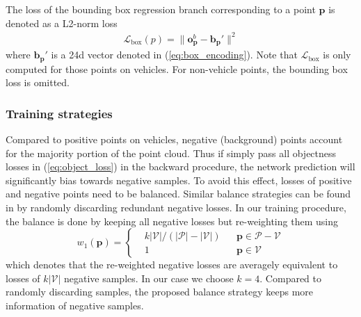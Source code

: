 \documentclass[conference]{IEEEtran}
\begin{document}
The loss of the bounding box regression branch corresponding to a point $\mathbf{p}$ is denoted as a L2-norm loss
\begin{equation}
\begin{aligned}
    \mathcal{L}_\textrm{box}(p) = \| \mathbf{o}^b_{\mathbf{p}} - \mathbf{b}_\mathbf{p}' \|^2
\end{aligned}
\label{eq:box_loss}
\end{equation}
where $\mathbf{b}_\mathbf{p}'$ is a 24d vector denoted in (\ref{eq:box_encoding}). Note that $\mathcal{L}_\textrm{box}$ is only computed for those points on vehicles. For non-vehicle points, the bounding box loss is omitted. 

\subsubsection{Training strategies}
Compared to positive points on vehicles, negative (background) points account for the majority portion of the point cloud. Thus if simply pass all objectness losses in (\ref{eq:object_loss}) in the backward procedure, the network prediction will significantly bias towards negative samples. To avoid this effect, losses of positive and negative points need to be balanced. Similar balance strategies can be found in \citet{Huang2015} by randomly discarding redundant negative losses. In our training procedure, the balance is done by keeping all negative losses but re-weighting them using
\begin{equation}
w_1(\mathbf{p}) = \left \{
\begin{aligned}
    & k |\mathcal{V}| / (|\mathcal{P}| - |\mathcal{V}|) & & {\mathbf{p} \in \mathcal{P} - \mathcal{V}} \\
    & 1 & & {\mathbf{p} \in \mathcal{V}}
\end{aligned}
\right.
\end{equation}
which denotes that the re-weighted negative losses are averagely equivalent to losses of $k |\mathcal{V}|$ negative samples. In our case we choose $k = 4$. Compared to randomly discarding samples, the proposed balance strategy keeps more information of negative samples.
\end{document}
